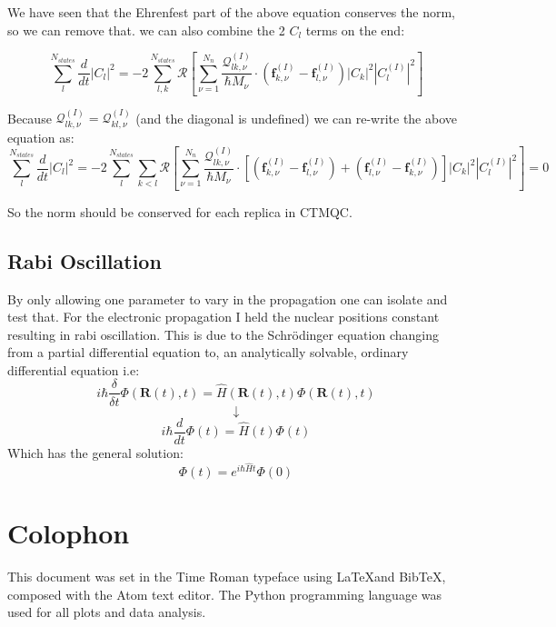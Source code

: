 We have seen that the Ehrenfest part of the above equation conserves the norm, so we can remove that. we can also combine the 2 $C_l$ terms on the end:

\[ \sum_{l}^{N_{states}} \frac{d}{dt} \vert C_{l} \vert^2 = -2 \sum_{l,k}^{N_{states}} \mathcal{R}\left[ \sum_{\nu=1}^{N_n}\frac{\mathcal{Q}_{lk,\nu}^{(I)}}{\hbar M_{\nu}}\cdot \left(\textbf{f}_{k,\nu}^{(I)} - \textbf{f}_{l,\nu}^{(I)}\right)|C_k|^2 |C_l^{(I)}|^2 \right] \]

Because $\mathcal{Q}_{lk,\nu}^{(I)} = \mathcal{Q}_{kl,\nu}^{(I)}$ (and the diagonal is undefined) we can re-write the above equation as:
\[ \sum_{l}^{N_{states}} \frac{d}{dt} \vert C_{l} \vert^2 = -2 \sum_{l}^{N_{states}} \sum_{k<l} \mathcal{R}\left[ \sum_{\nu=1}^{N_n}\frac{\mathcal{Q}_{lk,\nu}^{(I)}}{\hbar M_{\nu}}\cdot \left[ \left(\textbf{f}_{k,\nu}^{(I)} - \textbf{f}_{l,\nu}^{(I)}\right) + \left(\textbf{f}_{l,\nu}^{(I)} - \textbf{f}_{k,\nu}^{(I)}\right)\right]|C_k|^2 |C_l^{(I)}|^2 \right] = 0 \]

So the norm should be conserved for each replica in CTMQC.

\section{Rabi Oscillation \label{ap:Rabi}}
By only allowing one parameter to vary in the propagation one can isolate and test that. For the electronic propagation I held the nuclear positions constant resulting in rabi oscillation. This is due  to the Schr\"odinger equation changing from a partial differential equation to, an analytically solvable, ordinary differential equation  i.e:
\[i \hbar \frac{\delta}{\delta t} \Phi(\textbf{R}(t), t) = \hat{H}(\textbf{R}(t), t) \Phi(\textbf{R}(t), t)\]
\[\downarrow\]
\[i \hbar \frac{d}{d t} \Phi(t) = \hat{H}(t) \Phi( t)\]
Which has the general solution:
\[\Phi(t) = e^{i \hbar \hat{H}t} \Phi(0)\]




\chapter{Colophon}
\label{appendixlabel3}
This document was set in the Time Roman typeface using \LaTeX and Bib\TeX, composed with the Atom text editor. The Python programming language was used for all plots and data analysis. 
